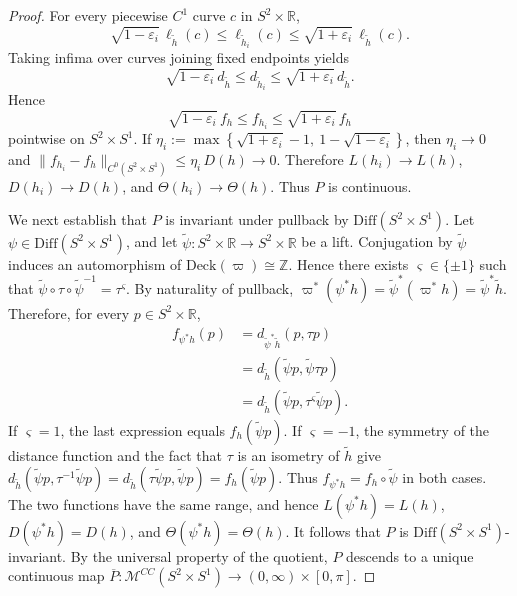 \documentclass[12pt,oneside,a4paper]{article}
\theoremstyle{mytheorem}
\theoremstyle{remark}
\theoremstyle{definition}
\begin{document}
\begin{proof}
For every piecewise \(C^1\) curve \(c\) in \(S^2\times \mathbb R\),
\[
\sqrt{1-\varepsilon_i}\,\ell_{\widetilde h}(c)
\le
\ell_{\widetilde h_i}(c)
\le
\sqrt{1+\varepsilon_i}\,\ell_{\widetilde h}(c).
\]
Taking infima over curves joining fixed endpoints yields
\[
\sqrt{1-\varepsilon_i}\,d_{\widetilde h}
\le
d_{\widetilde h_i}
\le
\sqrt{1+\varepsilon_i}\,d_{\widetilde h}.
\]
Hence
\[
\sqrt{1-\varepsilon_i}\,f_h\le f_{h_i}\le \sqrt{1+\varepsilon_i}\,f_h
\]
pointwise on \(S^2\times S^1\). If
\(\eta_i:=\max\!\left\{\sqrt{1+\varepsilon_i}-1,\ 1-\sqrt{1-\varepsilon_i}\right\}\),
then \(\eta_i\to 0\) and
\(\|f_{h_i}-f_h\|_{C^0(S^2\times S^1)}\le \eta_i\,D(h)\to 0\).
Therefore
\(L(h_i)\to L(h)\), \(D(h_i)\to D(h)\), and \(\Theta(h_i)\to \Theta(h)\).
Thus \(P\) is continuous.

We next establish that $P$ is invariant under pullback by
$\mathrm{Diff}(S^2\times S^1)$. Let $\psi\in\mathrm{Diff}(S^2\times S^1)$,
and let $\widetilde\psi\colon S^2\times\mathbb R\to S^2\times\mathbb R$ be a
lift. Conjugation by $\widetilde\psi$ induces an automorphism of
$\mathrm{Deck}(\varpi)\cong\mathbb Z$. Hence there exists
$\varsigma\in\{\pm1\}$ such that
\(\widetilde\psi\circ\tau\circ\widetilde\psi^{-1}=\tau^\varsigma\).
By naturality of pullback,
\(\varpi^*(\psi^*h)=\widetilde\psi^*(\varpi^*h)
=\widetilde\psi^*\widetilde h\).
Therefore, for every $p\in S^2\times\mathbb R$,
\[
\begin{aligned}
f_{\psi^*h}(p)
&=d_{\widetilde\psi^*\widetilde h}(p,\tau p)\\
&=d_{\widetilde h}(\widetilde\psi p,\widetilde\psi\tau p)\\
&=d_{\widetilde h}(\widetilde\psi p,\tau^\varsigma\widetilde\psi p).
\end{aligned}
\]
If $\varsigma=1$, the last expression equals $f_h(\widetilde\psi p)$. If
$\varsigma=-1$, the symmetry of the distance function and the fact that
$\tau$ is an isometry of $\widetilde h$ give
\(d_{\widetilde h}(\widetilde\psi p,\tau^{-1}\widetilde\psi p)
=d_{\widetilde h}(\tau\widetilde\psi p,\widetilde\psi p)
=f_h(\widetilde\psi p)\).
Thus $f_{\psi^*h}=f_h\circ\widetilde\psi$ in both cases. The two functions
have the same range, and hence
\(L(\psi^*h)=L(h)\), \(D(\psi^*h)=D(h)\), and \(\Theta(\psi^*h)=\Theta(h)\).
It follows that $P$ is $\mathrm{Diff}(S^2\times S^1)$-invariant. By the
universal property of the quotient, $P$ descends to a unique continuous map
\(\overline P\colon\mathcal{M}^{CC}(S^2\times S^1)
\to (0,\infty)\times[0,\pi]\).


\end{proof}
\end{document}
